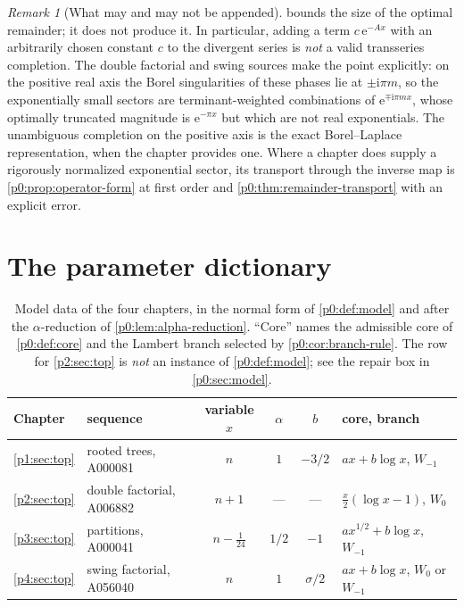 \documentclass[11pt,a4paper,oneside]{book}
\theoremstyle{plain}
\theoremstyle{definition}
\theoremstyle{remark}
\newtheorem{remark}[theorem]{Remark}
\newcommand{\e}{\mathrm{e}}
\newcommand{\ii}{\mathrm{i}}
\newcommand{\Wlam}{W}
\begin{document}
\begin{remark}[What may and may not be appended]\label{p0:rem:no-bare-exponential}
 bounds the size of the optimal remainder; it
does not produce it.  In particular, adding a term $c\,\e^{-Ax}$ with an
arbitrarily chosen constant $c$ to the divergent series is \emph{not} a valid
transseries completion.  The double factorial and swing sources make the point
explicitly: on the positive real axis the Borel singularities of these phases
lie at $\pm\ii\pi m$, so the exponentially small sectors are
terminant-weighted combinations of $\e^{\mp\ii\pi mx}$, whose optimally
truncated magnitude is $\e^{-\pi x}$ but which are not real exponentials.  The
unambiguous completion on the positive axis is the exact Borel--Laplace
representation, when the chapter provides one.  Where a chapter does supply a
rigorously normalized exponential sector, its transport through the inverse map
is \cref{p0:prop:operator-form} at first order and
\cref{p0:thm:remainder-transport} with an explicit error.
\end{remark}

\section{The parameter dictionary}\label{p0:sec:dictionary}

\begin{table}[htbp]
\centering
\caption{Model data of the four chapters, in the normal form of
\cref{p0:def:model} and after the $\alpha$-reduction of
\cref{p0:lem:alpha-reduction}.  ``Core'' names the admissible core of
\cref{p0:def:core} and the Lambert branch selected by
\cref{p0:cor:branch-rule}.  The row for \cref{p2:sec:top} is
\emph{not} an instance of \cref{p0:def:model}; see the repair box in
\cref{p0:sec:model}.}
\label{p0:tab:dictionary}
\begin{tabular}{llcccl}
\toprule
Chapter & sequence & variable $x$ & $\alpha$ & $b$ & core, branch\\
\midrule
\ref{p1:sec:top} & rooted trees, A000081 & $n$
 & $1$ & $-3/2$ & $ax+b\log x$, $\Wlam_{-1}$\\
\ref{p2:sec:top} & double factorial, A006882 & $n+1$
 & --- & --- & $\tfrac x2(\log x-1)$, $\Wlam_{0}$\\
\ref{p3:sec:top} & partitions, A000041 & $n-\tfrac1{24}$
 & $1/2$ & $-1$ & $ax^{1/2}+b\log x$, $\Wlam_{-1}$\\
\ref{p4:sec:top} & swing factorial, A056040 & $n$
 & $1$ & $\sigma/2$ & $ax+b\log x$, $\Wlam_{0}$ or $\Wlam_{-1}$\\
\bottomrule
\end{tabular}
\end{table}
\end{document}

